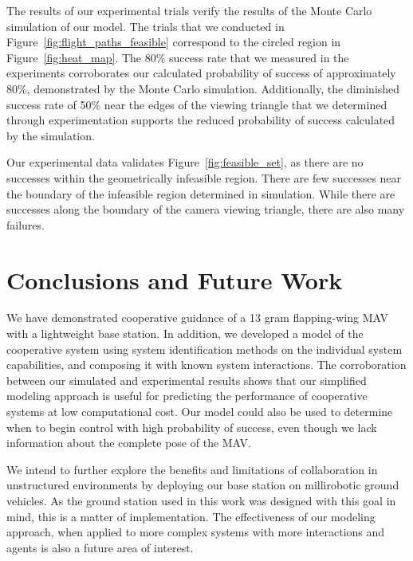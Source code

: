 \documentclass{aamas2013}
\begin{document}
The results of our experimental trials verify the results of the Monte Carlo
simulation of our model. The trials that we conducted in
Figure~\ref{fig:flight_paths_feasible} correspond to the circled region in
Figure~\ref{fig:heat_map}. The 80\% success rate that we measured in the
experiments corroborates our calculated probability of success of
approximately 80\%, demonstrated by the Monte Carlo simulation. Additionally,
the diminished success rate of 50\% near the edges of the viewing triangle
that we determined through experimentation supports the reduced probability of
success calculated by the simulation.

Our experimental data validates Figure~\ref{fig:feasible_set}, as there are 
no successes within the geometrically infeasible region. There are few 
successes near the boundary of the infeasible region determined in 
simulation. While there are successes along the boundary of the camera 
viewing triangle, there are also many failures.

\section{Conclusions and Future Work}
We have demonstrated cooperative guidance of a 13 gram flapping-wing MAV with
a lightweight base station. In addition, we developed a model of
the cooperative system using system identification methods on the individual
system capabilities, and composing it with known system interactions. The
corroboration between our simulated and experimental results shows that our
simplified modeling approach is useful for predicting the performance of
cooperative systems at low computational cost. Our model could also be used to
determine when to begin control with high probability of success, even though
we lack information about the complete pose of the MAV.

We intend to further explore the benefits and limitations of collaboration in
unstructured environments by deploying our base station on millirobotic ground
vehicles. As the ground station used in this work was designed with this goal
in mind, this is a matter of implementation. The effectiveness of our modeling
approach, when applied to more complex systems with more interactions and 
agents is also a future area of interest. 

\end{document}
